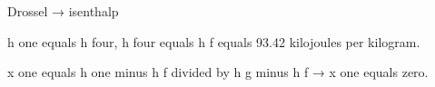 Drossel → isenthalp  

h one equals h four, h four equals h f equals 93.42 kilojoules per kilogram.  

x one equals h one minus h f divided by h g minus h f → x one equals zero.